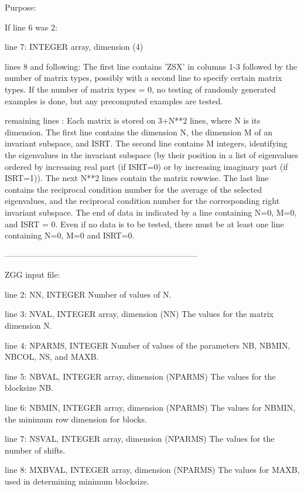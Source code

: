 \begin{DoxyParagraph}{Purpose\+: }
\begin{DoxyVerb}
 If line 6 was 2:

 line 7:  INTEGER array, dimension (4)

 lines 8 and following: The first line contains 'ZSX' in columns 1-3
          followed by the number of matrix types, possibly with
          a second line to specify certain matrix types.
          If the number of matrix types = 0, no testing of randomly
          generated examples is done, but any precomputed examples
          are tested.

 remaining lines : Each matrix is stored on 3+N**2 lines, where N is
          its dimension. The first line contains the dimension N, the
          dimension M of an invariant subspace, and ISRT. The second
          line contains M integers, identifying the eigenvalues in the
          invariant subspace (by their position in a list of
          eigenvalues ordered by increasing real part (if ISRT=0) or
          by increasing imaginary part (if ISRT=1)). The next N**2
          lines contain the matrix rowwise. The last line contains the
          reciprocal condition number for the average of the selected
          eigenvalues, and the reciprocal condition number for the
          corresponding right invariant subspace. The end of data in
          indicated by a line containing N=0, M=0, and ISRT = 0.  Even
          if no data is to be tested, there must be at least one line
          containing N=0, M=0 and ISRT=0.

-----------------------------------------------------------------------

 ZGG input file:

 line 2:  NN, INTEGER
          Number of values of N.

 line 3:  NVAL, INTEGER array, dimension (NN)
          The values for the matrix dimension N.

 line 4:  NPARMS, INTEGER
          Number of values of the parameters NB, NBMIN, NBCOL, NS, and
          MAXB.

 line 5:  NBVAL, INTEGER array, dimension (NPARMS)
          The values for the blocksize NB.

 line 6:  NBMIN, INTEGER array, dimension (NPARMS)
          The values for NBMIN, the minimum row dimension for blocks.

 line 7:  NSVAL, INTEGER array, dimension (NPARMS)
          The values for the number of shifts.

 line 8:  MXBVAL, INTEGER array, dimension (NPARMS)
          The values for MAXB, used in determining minimum blocksize.


\end{DoxyVerb}
\end{DoxyParagraph}
